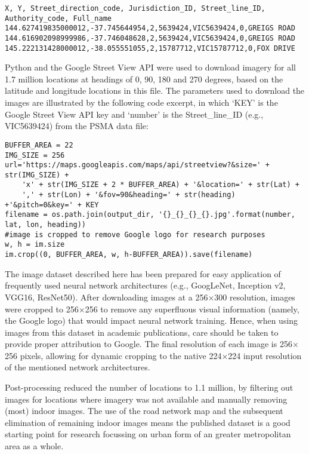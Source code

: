 \documentclass[final,3p,times,authoryear]{elsarticle}
\begin{document}
\begin{verbatim}
X, Y, Street_direction_code, Jurisdiction_ID, Street_line_ID, Authority_code, Full_name
144.627419835000012,-37.745644954,2,5639424,VIC5639424,0,GREIGS ROAD
144.616902098999986,-37.746048628,2,5639424,VIC5639424,0,GREIGS ROAD
145.222131428000012,-38.055551055,2,15787712,VIC15787712,0,FOX DRIVE
\end{verbatim}

Python and the Google Street View API \citep{GoogleMaps2017b} were used to download imagery for all 1.7 million locations at headings of 0, 90, 180 and 270 degrees, based on the latitude and longitude locations in this file. The parameters used to download the images are illustrated by the following code excerpt, in which `KEY' is the Google Street View API key and `number' is the Street\_line\_ID (e.g., VIC5639424) from the PSMA data file:

\begin{verbatim}
BUFFER_AREA = 22
IMG_SIZE = 256
url='https://maps.googleapis.com/maps/api/streetview?&size=' + str(IMG_SIZE) +
    'x' + str(IMG_SIZE + 2 * BUFFER_AREA) + '&location=' + str(Lat) +
    ',' + str(Lon) + '&fov=90&heading=' + str(heading) +'&pitch=0&key=' + KEY         
filename = os.path.join(output_dir, '{}_{}_{}_{}.jpg'.format(number, lat, lon, heading))
#image is cropped to remove Google logo for research purposes
w, h = im.size
im.crop((0, BUFFER_AREA, w, h-BUFFER_AREA)).save(filename)
\end{verbatim}

The image dataset described here has been prepared for easy application of frequently used neural network architectures (e.g., GoogLeNet, Inception v2, VGG16, ResNet50). After downloading images at a 256$\times$300 resolution, images were cropped to 256$\times$256 to remove any superfluous visual information (namely, the Google logo) that would impact neural network training. Hence, when using images from this dataset in academic publications, care should be taken to provide proper attribution to Google. The final resolution of each image is 256$\times$256 pixels, allowing for dynamic cropping to the native 224$\times$224 input resolution of the mentioned network architectures.

Post-processing reduced the number of locations to 1.1 million, by filtering out images for locations where imagery was not available and manually removing (most) indoor images. The use of the road network map and the subsequent elimination of remaining indoor images means the published dataset is a good starting point for research focussing on urban form of an greater metropolitan area as a whole.

 


\appendix
\setcounter{table}{0}
\renewcommand{\thetable}{A\arabic{table}}
\end{document}
